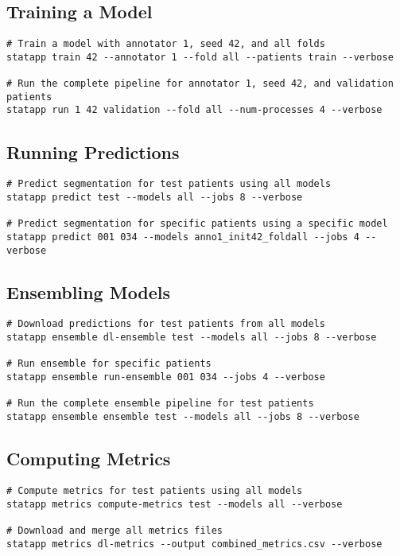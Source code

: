 \documentclass{article}
\begin{document}
\subsection{Training a Model}
\begin{lstlisting}
# Train a model with annotator 1, seed 42, and all folds
statapp train 42 --annotator 1 --fold all --patients train --verbose

# Run the complete pipeline for annotator 1, seed 42, and validation patients
statapp run 1 42 validation --fold all --num-processes 4 --verbose
\end{lstlisting}

\subsection{Running Predictions}
\begin{lstlisting}
# Predict segmentation for test patients using all models
statapp predict test --models all --jobs 8 --verbose

# Predict segmentation for specific patients using a specific model
statapp predict 001 034 --models anno1_init42_foldall --jobs 4 --verbose
\end{lstlisting}

\subsection{Ensembling Models}
\begin{lstlisting}
# Download predictions for test patients from all models
statapp ensemble dl-ensemble test --models all --jobs 8 --verbose

# Run ensemble for specific patients
statapp ensemble run-ensemble 001 034 --jobs 4 --verbose

# Run the complete ensemble pipeline for test patients
statapp ensemble ensemble test --models all --jobs 8 --verbose
\end{lstlisting}

\subsection{Computing Metrics}
\begin{lstlisting}
# Compute metrics for test patients using all models
statapp metrics compute-metrics test --models all --verbose

# Download and merge all metrics files
statapp metrics dl-metrics --output combined_metrics.csv --verbose
\end{lstlisting}
\end{document}
